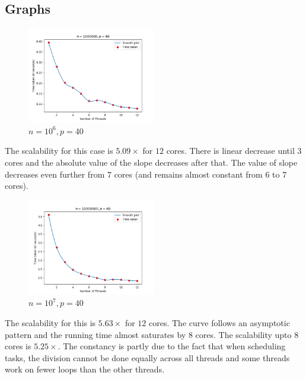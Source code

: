 \documentclass[11pt]{article}
\begin{document}
\subsection{Graphs}
\begin{figure}[H]
	\begin{center}
		\includegraphics[width=0.5\textwidth]{outputs/1e6_40_t12.png}
	\end{center}
	\caption{$n = 10^6, p = 40$}
	\label{fig:1e6_40}
\end{figure}
The scalability for this case is $5.09\times$ for $12$ cores. There is linear decrease until $3$ cores and the absolute value of the slope decreases after that. The value of slope decreases even further from $7$ cores (and remains almost constant from $6$ to $7$ cores).

\begin{figure}[H]
	\begin{center}
		\includegraphics[width=0.5\textwidth]{outputs/1e7_40_t12.png}
	\end{center}
	\caption{$n = 10^7, p = 40$}
	\label{fig:1e7_40}
\end{figure}
The scalability for this is $5.63\times$ for $12$ cores. The curve follows an asymptotic pattern and the running time almost saturates by $8$ cores. The scalability upto $8$ cores is $5.25\times$. The constancy is partly due to the fact that when scheduling tasks, the division cannot be done equally across all threads and some threads work on fewer loops than the other threads.
\end{document}
